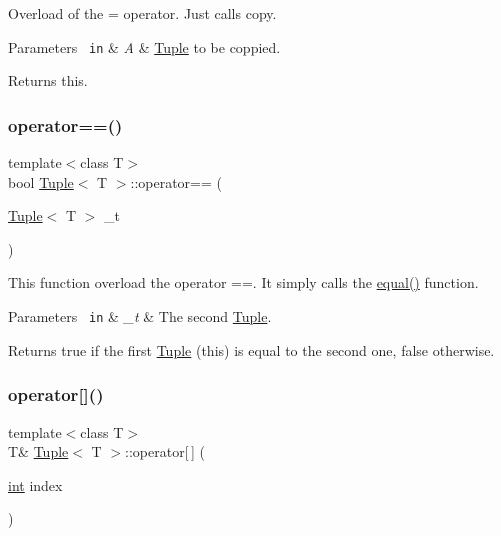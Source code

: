 Overload of the = operator. Just calls {\ttfamily copy}. 


\begin{DoxyParams}[1]{Parameters}
\mbox{\texttt{ in}}  & {\em A} & \mbox{\hyperlink{class_tuple}{Tuple}} to be coppied. \\
\hline
\end{DoxyParams}
\begin{DoxyReturn}{Returns}
this. 
\end{DoxyReturn}
\mbox{\label{class_tuple_ad8f90a7c0726fae5ac5651c4e16222cd}} 
\subsubsection{\texorpdfstring{operator==()}{operator==()}}
{\footnotesize\ttfamily template$<$class T$>$ \\
bool \mbox{\hyperlink{class_tuple}{Tuple}}$<$ T $>$\+::operator== (\begin{DoxyParamCaption}\item[{\mbox{\hyperlink{class_tuple}{Tuple}}$<$ T $>$}]{\+\_\+t }\end{DoxyParamCaption})\hspace{0.3cm}{\ttfamily [inline]}}

This function overload the operator ==. It simply calls the {\ttfamily \mbox{\hyperlink{class_tuple_a68d1d3aaecc187f8f78b46f4e1b48260}{equal()}}} function. 
\begin{DoxyParams}[1]{Parameters}
\mbox{\texttt{ in}}  & {\em \+\_\+t} & The second {\ttfamily \mbox{\hyperlink{class_tuple}{Tuple}}}. \\
\hline
\end{DoxyParams}
\begin{DoxyReturn}{Returns}
{\ttfamily true} if the first {\ttfamily \mbox{\hyperlink{class_tuple}{Tuple}}} (this) is equal to the second one, {\ttfamily false} otherwise. 
\end{DoxyReturn}
\mbox{\label{class_tuple_ae18a93053af932997709798b3fd5d12d}} 
\subsubsection{\texorpdfstring{operator[]()}{operator[]()}}
{\footnotesize\ttfamily template$<$class T$>$ \\
T\& \mbox{\hyperlink{class_tuple}{Tuple}}$<$ T $>$\+::operator\mbox{[}$\,$\mbox{]} (\begin{DoxyParamCaption}\item[{\mbox{\hyperlink{draw_8hh_aa620a13339ac3a1177c86edc549fda9b}{int}}}]{index }\end{DoxyParamCaption})\hspace{0.3cm}{\ttfamily [inline]}}



